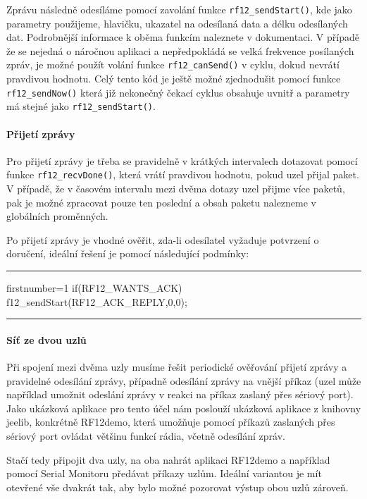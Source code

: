 \documentclass[12pt,titlepage]{article}
\newcommand{\codetitle}[1]{\bigskip \noindent {\scriptsize #1}\hrule}
\begin{document}
		Zprávu následně odesíláme pomocí zavolání funkce \texttt{rf12\_sendStart()}, kde jako parametry použijeme, hlavičku, ukazatel na odesílaná data a délku odesílaných dat. Podrobnější informace k oběma funkcím naleznete v dokumentaci. V případě že se nejedná o náročnou aplikaci a nepředpokládá se velká frekvence posílaných zpráv, je možné použít volání funkce \texttt{rf12\_canSend()} v cyklu, dokud nevrátí pravdivou hodnotu. Celý tento kód je ještě možné zjednodušit pomocí funkce \texttt{rf12\_sendNow()} která již nekonečný čekací cyklus obsahuje uvnitř a parametry má stejné jako \texttt{rf12\_sendStart()}. 
		
		\paragraph{Přijetí zprávy}
		Pro přijetí zprávy je třeba se pravidelně v krátkých intervalech dotazovat pomocí funkce \texttt{rf12\_recvDone()}, která vrátí pravdivou hodnotu, pokud uzel přijal paket. V případě, že v časovém intervalu mezi dvěma dotazy uzel přijme více paketů, pak je možné zpracovat pouze ten poslední a obsah paketu nalezneme v globálních proměnných. 
		
		Po přijetí zprávy  je vhodné ověřit, zda-li odesílatel vyžaduje potvrzení o doručení, ideální řešení je pomocí následující podmínky:

		
\codetitle{Ukázka podmínky pro odeslání ACK zprávy}
\begin{cppcode*}{firstnumber=1}		
if(RF12_WANTS_ACK){
    f12_sendStart(RF12_ACK_REPLY,0,0);
}
\end{cppcode*}		
\hrule
\bigskip 
	
		\paragraph{Síť ze dvou uzlů}
        Při spojení mezi dvěma uzly musíme řešit periodické ověřování přijetí zprávy a pravidelné odesílání zprávy, případně odesílání zprávy na vnější příkaz (uzel může například umožnit odeslání zprávy v reakci na příkaz zaslaný přes sériový port). Jako ukázková aplikace pro tento účel nám poslouží ukázková aplikace z knihovny jeelib, konkrétně RF12demo, která umožňuje pomocí příkazů zaslaných přes sériový port ovládat většinu funkcí rádia, včetně odesílání zpráv. 
        
        Stačí tedy připojit dva uzly, na oba nahrát aplikaci RF12demo a například pomocí Serial Monitoru předávat příkazy uzlům. Ideální variantou je mít otevřené vše dvakrát tak, aby bylo možné pozorovat výstup obou uzlů zároveň. 
\end{document}
